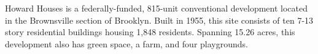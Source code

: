 Howard Houses is a federally-funded, 815-unit conventional development located in the Brownsville section of Brooklyn. Built in 1955, this site consists of ten 7-13 story residential buildings housing 1,848 residents. Spanning 15.26 acres, this development also has green space, a farm, and four playgrounds.